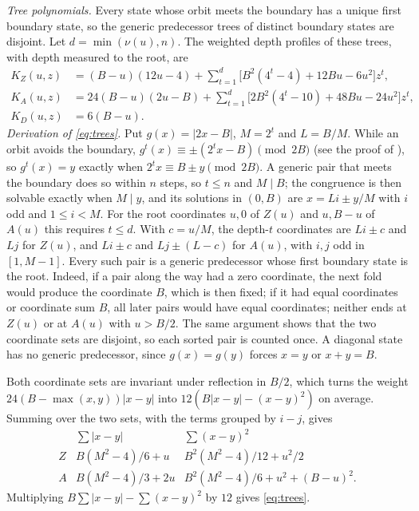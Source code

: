 \documentclass[11pt]{amsart}
\theoremstyle{remark}
\newcommand{\vt}{\nu}
\begin{document}
\emph{Tree polynomials.} Every state whose orbit meets the boundary has a unique first boundary state, so the generic predecessor trees of distinct boundary states are disjoint. Let $d=\min(\vt(u),n)$. The weighted depth profiles of these trees, with depth measured to the root, are
\begin{equation}\label{eq:trees}
\begin{aligned}
K_Z(u,z)&=(B-u)(12u-4)+\sum_{t=1}^d\bigl[B^2(4^t-4)+12Bu-6u^2\bigr]z^t,\\
K_A(u,z)&=24(B-u)(2u-B)+\sum_{t=1}^d\bigl[2B^2(4^t-10)+48Bu-24u^2\bigr]z^t,\\
K_D(u,z)&=6(B-u).
\end{aligned}
\end{equation}
\emph{Derivation of \eqref{eq:trees}.} Put $g(x)=|2x-B|$, $M=2^t$ and $L=B/M$. While an orbit avoids the boundary, $g^t(x)\equiv\pm(2^tx-B)\pmod{2B}$ (see the proof of \cite[Lemma~5]{G1}), so $g^t(x)=y$ exactly when $2^tx\equiv B\pm y\pmod{2B}$. A generic pair that meets the boundary does so within $n$ steps, so $t\le n$ and $M\mid B$; the congruence is then solvable exactly when $M\mid y$, and its solutions in $(0,B)$ are $x=Li\pm y/M$ with $i$ odd and $1\le i<M$. For the root coordinates $u,0$ of $Z(u)$ and $u,B-u$ of $A(u)$ this requires $t\le d$. With $c=u/M$, the depth-$t$ coordinates are $Li\pm c$ and $Lj$ for $Z(u)$, and $Li\pm c$ and $Lj\pm(L-c)$ for $A(u)$, with $i,j$ odd in $[1,M-1]$. Every such pair is a generic predecessor whose first boundary state is the root. Indeed, if a pair along the way had a zero coordinate, the next fold would produce the coordinate $B$, which is then fixed; if it had equal coordinates or coordinate sum $B$, all later pairs would have equal coordinates; neither ends at $Z(u)$ or at $A(u)$ with $u>B/2$. The same argument shows that the two coordinate sets are disjoint, so each sorted pair is counted once. A diagonal state has no generic predecessor, since $g(x)=g(y)$ forces $x=y$ or $x+y=B$.

Both coordinate sets are invariant under reflection in $B/2$, which turns the weight $24(B-\max(x,y))|x-y|$ into $12(B|x-y|-(x-y)^2)$ on average. Summing over the two sets, with the terms grouped by $i-j$, gives
\[
\begin{array}{c|c|c}
&\sum|x-y|&\sum(x-y)^2\\ \hline
Z&B(M^2-4)/6+u&B^2(M^2-4)/12+u^2/2\\
A&B(M^2-4)/3+2u&B^2(M^2-4)/6+u^2+(B-u)^2.
\end{array}
\]
Multiplying $B\sum|x-y|-\sum(x-y)^2$ by $12$ gives \eqref{eq:trees}.
\end{document}
